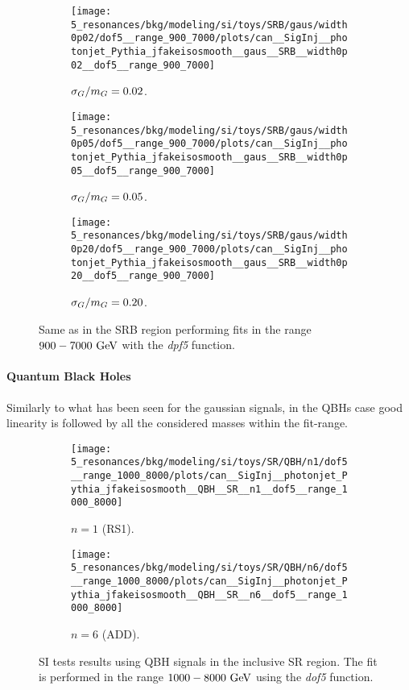 \begin{figure}[ht!]
    \centering
    \begin{subfigure}[h]{0.32\linewidth}
        \centering
        \texttt{[image: 5\_resonances/bkg/modeling/si/toys/SRB/gaus/width0p02/dof5\_\_range\_900\_7000/plots/can\_\_SigInj\_\_photonjet\_Pythia\_jfakeisosmooth\_\_gaus\_\_SRB\_\_width0p02\_\_dof5\_\_range\_900\_7000]}
        \caption{\(\sigma_G/m_{G} = 0.02\).}
    \end{subfigure}
    \hfill
    \begin{subfigure}[h]{0.32\linewidth}
        \centering
        \texttt{[image: 5\_resonances/bkg/modeling/si/toys/SRB/gaus/width0p05/dof5\_\_range\_900\_7000/plots/can\_\_SigInj\_\_photonjet\_Pythia\_jfakeisosmooth\_\_gaus\_\_SRB\_\_width0p05\_\_dof5\_\_range\_900\_7000]}
        \caption{\(\sigma_G/m_{G} = 0.05\).}
    \end{subfigure}
    \hfill
    \begin{subfigure}[h]{0.32\linewidth}
        \centering
        \texttt{[image: 5\_resonances/bkg/modeling/si/toys/SRB/gaus/width0p20/dof5\_\_range\_900\_7000/plots/can\_\_SigInj\_\_photonjet\_Pythia\_jfakeisosmooth\_\_gaus\_\_SRB\_\_width0p20\_\_dof5\_\_range\_900\_7000]}
        \caption{\(\sigma_G/m_{G} = 0.20\).}
    \end{subfigure}
    \caption{Same as \Fig{\ref{fig:si_results:siginj_gaus_SR}} in the SRB region performing fits in the range \(900-7000~\text{GeV}\) with the \textit{dpf5} function.}
    \label{fig:si_results:siginj_gaus_SRB}
\end{figure}



\paragraph{Quantum Black Holes}
Similarly to what has been seen for the gaussian signals, in the \acp{QBH} case good linearity is followed by all the considered masses within the fit-range.

\begin{figure}[ht!]
    \centering
    \begin{subfigure}[h]{0.49\linewidth}
        \centering
        \texttt{[image: 5\_resonances/bkg/modeling/si/toys/SR/QBH/n1/dof5\_\_range\_1000\_8000/plots/can\_\_SigInj\_\_photonjet\_Pythia\_jfakeisosmooth\_\_QBH\_\_SR\_\_n1\_\_dof5\_\_range\_1000\_8000]}
        \caption{\(n = 1\) (RS1).}
    \end{subfigure}
    \hfill
    \begin{subfigure}[h]{0.49\linewidth}
        \centering
        \texttt{[image: 5\_resonances/bkg/modeling/si/toys/SR/QBH/n6/dof5\_\_range\_1000\_8000/plots/can\_\_SigInj\_\_photonjet\_Pythia\_jfakeisosmooth\_\_QBH\_\_SR\_\_n6\_\_dof5\_\_range\_1000\_8000]}
        \caption{\(n = 6\) (ADD).}
    \end{subfigure}
    \caption{\ac{SI} tests results using \ac{QBH} signals in the inclusive SR region. The fit is performed in the range \(1000-8000~\text{GeV}\) using the \textit{dof5} function.}
    \label{fig:si_results:siginj_QBH_SR}
\end{figure}